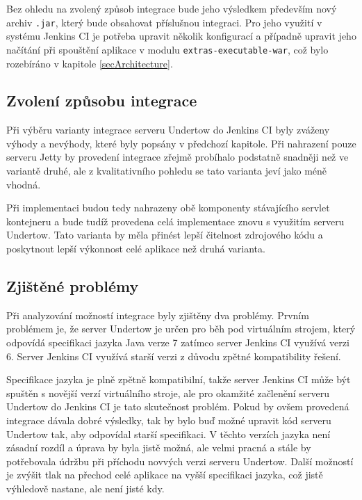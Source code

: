             Bez ohledu na zvolený způsob integrace bude jeho výsledkem především nový archiv \texttt{.jar},
            který bude obsahovat příslušnou integraci. Pro jeho využití v systému Jenkins CI je potřeba
            upravit několik konfigurací a případně upravit jeho načítání při spouštění aplikace v modulu
            \texttt{extras-executable-war}, což bylo rozebíráno v kapitole \ref{secArchitecture}.


        \subsection{Zvolení způsobu integrace}
            Při výběru varianty integrace serveru Undertow do Jenkins CI byly zváženy
            výhody a nevýhody, které byly popsány v předchozí kapitole. Při nahrazení pouze serveru Jetty
            by provedení integrace zřejmě probíhalo podstatně snadněji než ve variantě druhé,
            ale z kvalitativního pohledu se tato varianta jeví jako méně vhodná. 

            Při implementaci budou tedy nahrazeny obě komponenty stávajícího servlet kontejneru
            a bude tudíž provedena celá implementace znovu s využitím serveru Undertow. Tato
            varianta by měla přinést lepší čitelnost zdrojového kódu a poskytnout 
            lepší výkonnost celé aplikace než druhá varianta.

        \subsection{Zjištěné problémy}
            Při analyzování možností integrace byly zjištěny dva problémy.
            Prvním problémem je, že server Undertow
            je určen pro běh pod virtuálním strojem, který odpovídá specifikaci jazyka
            Java verze 7 zatímco server Jenkins CI využívá verzi 6. 
            Server Jenkins CI využívá starší verzi z důvodu zpětné kompatibility
            řešení. 
            
            Specifikace jazyka je plně zpětně kompatibilní, takže server Jenkins CI
            může být spuštěn s novější verzí virtuálního stroje, ale pro okamžité začlenění
            serveru Undertow do Jenkins CI je tato skutečnost problém. Pokud by ovšem
            provedená integrace dávala dobré výsledky, tak by bylo buď možné 
            upravit kód serveru Undertow tak, aby odpovídal starší specifikaci.
            V těchto verzích jazyka není zásadní rozdíl a úprava by byla jistě
            možná, ale velmi pracná a stále by potřebovala údržbu při příchodu
            novvých verzi serveru Undertow. Další možností je
            zvýšit tlak na přechod celé aplikace na vyšší specifikaci jazyka,
            což jistě výhledově nastane, ale není jisté kdy. 

